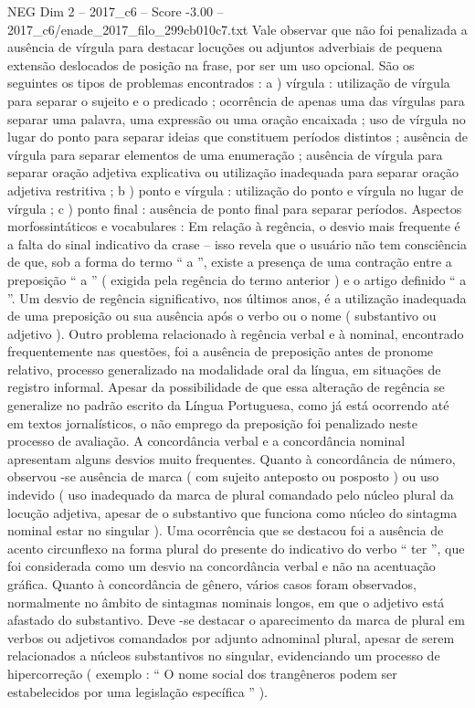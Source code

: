 \begin{textsample}{NEG Dim 2 – 2017\_c6 – Score -3.00 – 2017\_c6/enade\_2017\_filo\_299cb010c7.txt}
Vale observar que não foi penalizada a ausência de vírgula para destacar locuções ou adjuntos adverbiais de pequena extensão deslocados de posição na frase, por ser um uso opcional.
São os seguintes os tipos de problemas encontrados : a ) vírgula : utilização de vírgula para separar o sujeito e o predicado ; ocorrência de apenas uma das vírgulas para separar uma palavra, uma expressão ou uma oração encaixada ; uso de vírgula no lugar do ponto para separar ideias que constituem períodos distintos ; ausência de vírgula para separar elementos de uma enumeração ; ausência de vírgula para separar oração adjetiva explicativa ou utilização inadequada para separar oração adjetiva restritiva ; b ) ponto e vírgula : utilização do ponto e vírgula no lugar de vírgula ; c ) ponto final : ausência de ponto final para separar períodos.
Aspectos morfossintáticos e vocabulares : Em relação à regência, o desvio mais frequente é a falta do sinal indicativo da crase – isso revela que o usuário não tem consciência de que, sob a forma do termo “ a ”, existe a presença de uma contração entre a preposição “ a ” ( exigida pela regência do termo anterior ) e o artigo definido “ a ”.
Um desvio de regência significativo, nos últimos anos, é a utilização inadequada de uma preposição ou sua ausência após o verbo ou o nome ( substantivo ou adjetivo ).
Outro problema relacionado à regência verbal e à nominal, encontrado frequentemente nas questões, foi a ausência de preposição antes de pronome relativo, processo generalizado na modalidade oral da língua, em situações de registro informal.
Apesar da possibilidade de que essa alteração de regência se generalize no padrão escrito da Língua Portuguesa, como já está ocorrendo até em textos jornalísticos, o não emprego da preposição foi penalizado neste processo de avaliação.
A concordância verbal e a concordância nominal apresentam alguns desvios muito frequentes.
Quanto à concordância de número, observou -se ausência de marca ( com sujeito anteposto ou posposto ) ou uso indevido ( uso inadequado da marca de plural comandado pelo núcleo plural da locução adjetiva, apesar de o substantivo que funciona como núcleo do sintagma nominal estar no singular ).
Uma ocorrência que se destacou foi a ausência de acento circunflexo na forma plural do presente do indicativo do verbo “ ter ”, que foi considerada como um desvio na concordância verbal e não na acentuação gráfica.
Quanto à concordância de gênero, vários casos foram observados, normalmente no âmbito de sintagmas nominais longos, em que o adjetivo está afastado do substantivo.
Deve -se destacar o aparecimento da marca de plural em verbos ou adjetivos comandados por adjunto adnominal plural, apesar de serem relacionados a núcleos substantivos no singular, evidenciando um processo de hipercorreção ( exemplo : “ O nome social dos trangêneros podem ser estabelecidos por uma legislação específica ” ).

\end{textsample}
